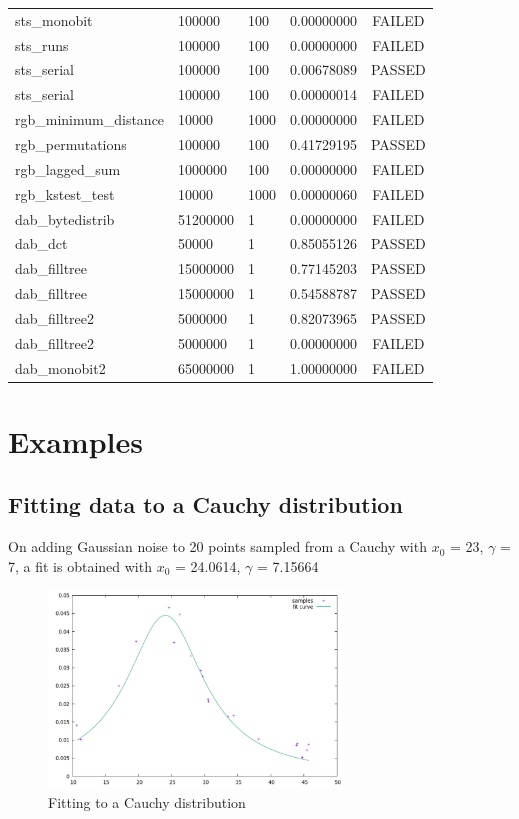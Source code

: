 \documentclass[titlepage, 11pt]{article}
\begin{document}
\begin{table}[!htb]
\begin{tabular}{l|l|l|c|c}
sts\_monobit & 100000 & 100 & 0.00000000 & FAILED \\
sts\_runs & 100000 & 100 & 0.00000000 & FAILED \\
sts\_serial & 100000 & 100 & 0.00678089 & PASSED \\
sts\_serial & 100000 & 100 & 0.00000014 & FAILED \\
rgb\_minimum\_distance & 10000 & 1000 & 0.00000000 & FAILED \\
rgb\_permutations & 100000 & 100 & 0.41729195 & PASSED \\
rgb\_lagged\_sum & 1000000 & 100 & 0.00000000 & FAILED \\
rgb\_kstest\_test & 10000 & 1000 & 0.00000060 & FAILED \\
dab\_bytedistrib & 51200000 & 1 & 0.00000000 & FAILED \\
dab\_dct & 50000 & 1 & 0.85055126 & PASSED \\
dab\_filltree & 15000000 & 1 & 0.77145203 & PASSED \\
dab\_filltree & 15000000 & 1 & 0.54588787 & PASSED \\
dab\_filltree2 & 5000000 & 1 & 0.82073965 & PASSED \\
dab\_filltree2 & 5000000 & 1 & 0.00000000 & FAILED \\
dab\_monobit2 & 65000000 & 1 & 1.00000000 & FAILED
\end{tabular}
\end{table}



\newpage
\pagebreak


\section{Examples}
\subsection{Fitting data to a Cauchy distribution}
On adding Gaussian noise to 20 points sampled from a Cauchy with $x_0$ = 23, $\gamma$ = 7, a 
fit is obtained with $x_0$ = 24.0614, $\gamma$ = 7.15664
\begin{figure}[!ht]
    \centering
    \includegraphics[width=0.7\textwidth]{images/fit_cauchy.pdf}
    \caption{Fitting to a Cauchy distribution}
    \label{fig:example-curve-fitting-cauchy}
\end{figure}
\end{document}
